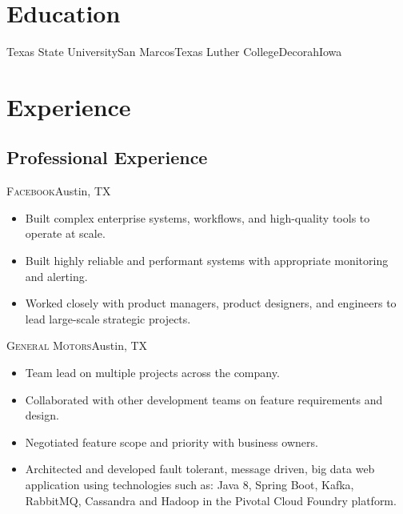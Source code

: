 \documentclass[11pt,letterpaper,sans]{moderncv}
\begin{document}

\section{Education}
           {Texas State University}{San Marcos}{Texas}{}
           {Luther College}{Decorah}{Iowa}{}



\section{Experience}

  \subsection{Professional Experience}

     {\textsc{Facebook}}{Austin, TX}{}
     {\begin{itemize}
         \item Built complex enterprise systems, workflows, and
               high-quality tools to operate at scale.
         \item Built highly reliable and performant systems with
               appropriate monitoring and alerting.
         \item Worked closely with product managers, product
               designers, and engineers to lead large-scale
               strategic projects.
     \end{itemize}}

     {\textsc{General Motors}}{Austin, TX}{}
     {\begin{itemize}
         \item Team lead on multiple projects across the company.
         \item Collaborated with other development teams on feature
               requirements and design.
         \item Negotiated feature scope and priority with business
               owners.
         \item Architected and developed fault tolerant, message
               driven, big data web application using technologies such
               as: Java 8, Spring Boot, Kafka, RabbitMQ, Cassandra and
               Hadoop in the Pivotal Cloud Foundry platform.
     \end{itemize}}
\end{document}
